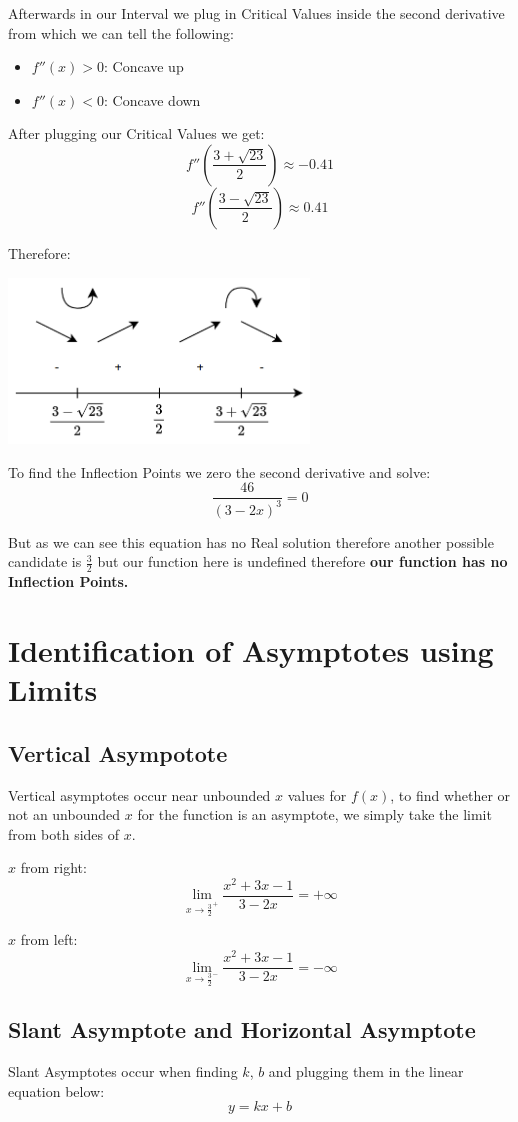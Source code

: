 \documentclass[11pt]{article}
\begin{document}
Afterwards in our Interval we plug in Critical Values inside the second derivative from which we can tell the following:
\begin{itemize}
\item \(f''(x) > 0\): Concave up
\item \(f''(x) < 0\): Concave down
\end{itemize}

After plugging our Critical Values we get:
\[
f''\left(\frac{3+\sqrt{23}}{2}\right) \approx -0.41
\]
\[
f''\left(\frac{3-\sqrt{23}}{2}\right) \approx 0.41
\]

\newpage
Therefore:
\begin{center}
\includegraphics[width=0.6\textwidth]{./skarmbild2.png}
\end{center}

To find the Inflection Points we zero the second derivative and solve:
\[
\frac{46}{(3-2x)^3} = 0
\]

But as we can see this equation has no Real solution therefore another possible candidate is \(\frac{3}{2}\) but our function here is undefined therefore \textbf{our function has no Inflection Points.}
\section{Identification of Asymptotes using Limits}
\label{sec:org3d09627}
\subsection{Vertical Asympotote}
\label{sec:org1c17a04}
Vertical asymptotes occur near unbounded \(x\) values for \(f(x)\), to find whether or not an unbounded \(x\) for the function is an asymptote, we simply take the limit from both sides of \(x\).

\(x\) from right:
\[
\lim_{x\to\frac{3}{2}^+} \frac{x^2+3x-1}{3-2x} = +\infty
\]

\(x\) from left:
\[
\lim_{x\to\frac{3}{2}^-} \frac{x^2+3x-1}{3-2x} = -\infty
\]
\subsection{Slant Asymptote and Horizontal Asymptote}
\label{sec:orgf4ceaf2}
Slant Asymptotes occur when finding \(k\), \(b\) and plugging them in the linear equation below:
\[
y=kx+b
\]
\end{document}
